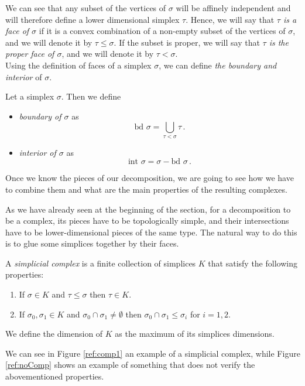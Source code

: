 \documentclass[../main.tex]{subfiles}
\begin{document}
We can see that any subset of the vertices of $\sigma$ will be affinely independent and will therefore define a lower dimensional simplex $\tau$. Hence, we will say that \emph{$\tau$ is a face of $\sigma$} if it is a convex combination of a non-empty subset of the vertices of $\sigma$, and we will denote it by $\tau \leq \sigma$. If the subset is proper, we will say that \emph{$\tau$ is the proper face of $\sigma$}, and we will denote it by $\tau < \sigma$.\\

Using the definition of faces of a simplex $\sigma$, we can define \emph{the boundary and interior} of $\sigma$.

\begin{definition}
Let a simplex $\sigma$. Then we define
\begin{itemize}
	\item \emph{boundary of $\sigma$} as \[\text{bd } \sigma = \bigcup_{\tau<\sigma}\tau\,.\]
	\item \emph{interior of $\sigma$} as \[\text{int }\sigma= \sigma - \text{bd }\sigma\,.\]
\end{itemize}
\end{definition}

Once we know the pieces of our decomposition, we are going to see how we have to combine them and what are the main properties of the resulting complexes.

As we have already seen at the beginning of the section, for a decomposition to be a complex, its pieces have to be topologically simple, and their intersections have to be lower-dimensional pieces of the same type. The natural way to do this is to glue some simplices together by their faces.

\begin{definition}
A \emph{simplicial complex} is a finite collection of simplices $K$ that satisfy the following properties:
\begin{enumerate}
	\item If $\sigma \in K$ and $\tau \leq \sigma$ then $\tau \in K$.
	\item If $\sigma_0,\sigma_1 \in K$ and $\sigma_0 \cap \sigma_1 \neq \emptyset$ then $\sigma_0 \cap \sigma_1 \leq \sigma_i$ for $i = 1,2$.
\end{enumerate}
\end{definition}

We define the dimension of $K$ as the maximum of its simplices dimensions.

We can see in Figure \ref{ref:comp1} an example of a simplicial complex, while Figure \ref{ref:noComp} shows an example of something that does not verify the abovementioned properties.
\end{document}
